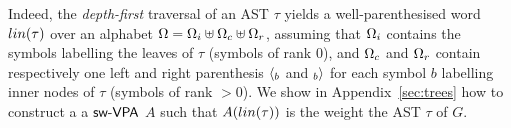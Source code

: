 %
Indeed, the \emph{depth-first} traversal of an AST $\tau$ 
yields a well-parenthesised word $\lin(\tau)$ over an alphabet 
$\Omega = \Omegai \uplus \Omegac \uplus \Omegar$,  
assuming \eg that $\Omegai$ contains the symbols labelling the leaves of $\tau$ (symbols of rank $0$), 
and $\Omegac$ and $\Omegar$ contain respectively one left and right parenthesis
$\langle_{b}$ and $_{b}{\rangle}$ for each symbol $b$ labelling inner nodes of $\tau$ (symbols of rank $>0$). 
%
%
We show in Appendix~\ref{sec:trees} how to construct a 
a $\textsf{sw-VPA}$ $A$ such that $A(\lin(\tau))$ is the weight the AST $\tau$ of $G$.

%
%
%
%
%
%


